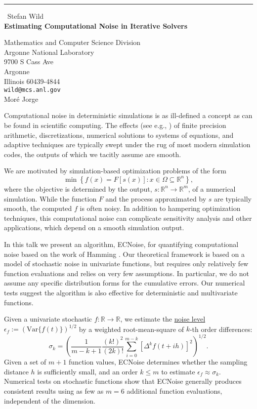 \documentclass{report}
\begin{document}
\begin{center}
\rule{6in}{1pt} \
{\large Stefan Wild \\
{\bf Estimating Computational Noise in Iterative Solvers}}

Mathematics and Computer Science Division \\ Argonne National Laboratory \\ 9700 S Cass Ave \\ Argonne \\ Illinois 60439-4844
\\
{\tt wild@mcs.anl.gov}\\
Mor\'{e} Jorge\end{center}


Computational noise in deterministic simulations is as ill-defined a
concept as can be found in scientific computing. The effects (see e.g.,
\cite{Higham2002}) of finite precision arithmetic, discretizations,
numerical solutions to systems of equations, and adaptive techniques are
typically swept under the rug of most modern simulation codes, the
outputs of which we tacitly assume are smooth.

We are motivated by simulation-based optimization problems of the form
\begin{equation}
\min\left\{ f(x)=F[s(x)] : x\in \Omega\subseteq \mathbb{R}^n\right\},
\label{eq:spopt}
\end{equation}
where the objective is determined by the output,
$s:\mathbb{R}^n\rightarrow \mathbb{R}^m$, of a numerical simulation.
While the function $F$ and the process approximated by $s$ are typically
smooth, the computed $f$ is often noisy. In addition to hampering
optimization techniques, this computational noise can complicate
sensitivity analysis and other applications, which depend on a smooth
simulation output.

In this talk we present an algorithm, \textsf{ECNoise}, for quantifying
computational noise based on the work of Hamming \cite{hamming1971ian}.
Our theoretical framework is based on a model of stochastic noise in
univariate functions,
but requires only relatively few function evaluations and relies on very
few assumptions. In particular, we do not assume any specific
distribution forms for the cumulative errors. Our numerical tests suggest
the algorithm is also effective for deterministic and multivariate
functions.

Given a univariate stochastic $f: \mathbb{R} \rightarrow \mathbb{R}$, we
estimate the \underline{noise level}
$\epsilon_f:=\left(\mbox{Var}\{f(t)\}\right)^{1/2}$ by a weighted
root-mean-square of $k$-th order differences:
\begin{equation}
\sigma_k = \left(\frac{1}{m-k+1}\frac{(k!)^2}{(2k)!} \sum_{i=0}^{m-k}
\left[\Delta^k f(t+ih) \right]^2\right)^{1/2}.
\label{eq:est}
\end{equation}
Given a set of $m+1$ function values, \textsf{ECNoise} determines whether
the sampling distance $h$ is sufficiently small, and an order $k\leq m$
to estimate $\epsilon_f \approx \sigma_k$. Numerical tests on stochastic
functions show that \textsf{ECNoise} generally produces consistent
results using as few as $m=6$ additional function evaluations,
independent of the dimension.
\end{document}
